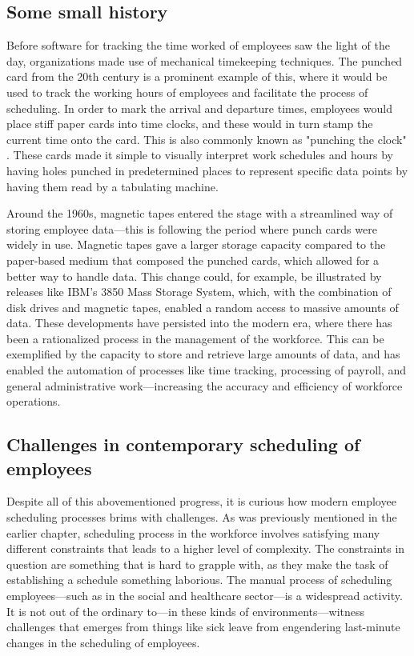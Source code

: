 \documentclass[nomenclature, english, bibtex]{kththesis}
\begin{document}
\subsection{Some small history}
Before software for tracking the time worked of employees saw the light of the day, organizations made use of mechanical timekeeping techniques. The punched card from the 20th century is a prominent example of this, where it would be used to track the working hours of employees and facilitate the process of scheduling. In order to mark the arrival and departure times, employees would place stiff paper cards into time clocks, and these would in turn stamp the current time onto the card. This is also commonly known as "punching the clock" \cite{cambridge_punchclock}. These cards made it simple to visually interpret work schedules and hours by having holes punched in predetermined places to represent specific data points by having them read by a tabulating machine. \cite{ibm_punched_card} 


Around the 1960s, magnetic tapes entered the stage with a streamlined way of storing employee data—this is following the period where punch cards were widely in use. Magnetic tapes gave a larger storage capacity compared to the paper-based medium that composed the punched cards, which allowed for a better way to handle data. This change could, for example, be illustrated by releases like IBM's 3850 Mass Storage System, which, with the combination of disk drives and magnetic tapes, enabled a random access to massive amounts of data. \cite{noauthor_undated-hc} These developments have persisted into the modern era, where there has been a rationalized process in the management of the workforce. This can be exemplified by the capacity to store and retrieve large amounts of data, and has enabled the automation of processes like time tracking, processing of payroll, and general administrative work—increasing the accuracy and efficiency of workforce operations. \cite{Angela2024-aw} 
\subsection{Challenges in contemporary scheduling of employees}
Despite all of this abovementioned progress, it is curious how modern employee scheduling processes brims with challenges. As was previously mentioned in the earlier chapter, scheduling process in the workforce involves satisfying many different constraints that leads to a higher level of complexity. The constraints in question are something that is hard to grapple with, as they make the task of establishing a schedule something laborious. The manual process of scheduling employees—such as in the social and healthcare sector—is a widespread activity. It is not out of the ordinary to—in these kinds of environments—witness challenges that emerges from things like sick leave from engendering last-minute changes in the scheduling of employees. \cite{ohlund2025}
\end{document}
